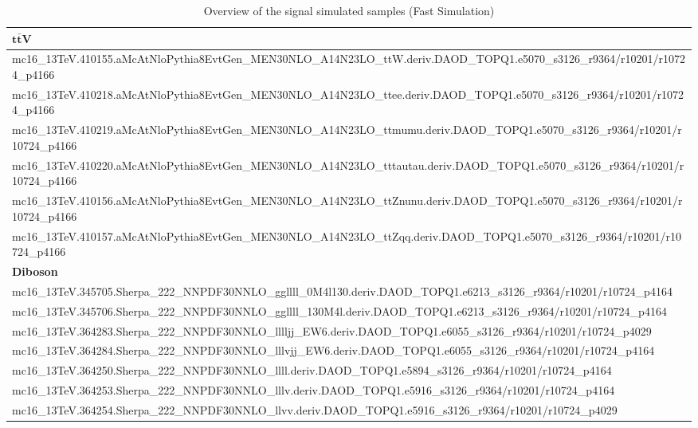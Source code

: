 	
	\begin{table}[htbp]
	\caption {Overview of the signal simulated samples (Fast Simulation)}
	\label{tab:mc_bkg_nom}
		\notsotiny
		\centering
	\begin{adjustwidth}{-0.6cm}{}
			\begin{tabular}{l}
			\toprule	
			$\mathbf{t\bar{t}V}$ \\
			\hline
			mc16\_13TeV.410155.aMcAtNloPythia8EvtGen\_MEN30NLO\_A14N23LO\_ttW.deriv.DAOD\_TOPQ1.e5070\_s3126\_r9364/r10201/r10724\_p4166 \\
			mc16\_13TeV.410218.aMcAtNloPythia8EvtGen\_MEN30NLO\_A14N23LO\_ttee.deriv.DAOD\_TOPQ1.e5070\_s3126\_r9364/r10201/r10724\_p4166 \\
			mc16\_13TeV.410219.aMcAtNloPythia8EvtGen\_MEN30NLO\_A14N23LO\_ttmumu.deriv.DAOD\_TOPQ1.e5070\_s3126\_r9364/r10201/r10724\_p4166 \\
			mc16\_13TeV.410220.aMcAtNloPythia8EvtGen\_MEN30NLO\_A14N23LO\_tttautau.deriv.DAOD\_TOPQ1.e5070\_s3126\_r9364/r10201/r10724\_p4166 \\
			mc16\_13TeV.410156.aMcAtNloPythia8EvtGen\_MEN30NLO\_A14N23LO\_ttZnunu.deriv.DAOD\_TOPQ1.e5070\_s3126\_r9364/r10201/r10724\_p4166 \\
			mc16\_13TeV.410157.aMcAtNloPythia8EvtGen\_MEN30NLO\_A14N23LO\_ttZqq.deriv.DAOD\_TOPQ1.e5070\_s3126\_r9364/r10201/r10724\_p4166 \\
			\hline
			\textbf{Diboson} \\
			\hline
			mc16\_13TeV.345705.Sherpa\_222\_NNPDF30NNLO\_ggllll\_0M4l130.deriv.DAOD\_TOPQ1.e6213\_s3126\_r9364/r10201/r10724\_p4164 \\
			mc16\_13TeV.345706.Sherpa\_222\_NNPDF30NNLO\_ggllll\_130M4l.deriv.DAOD\_TOPQ1.e6213\_s3126\_r9364/r10201/r10724\_p4164 \\
			mc16\_13TeV.364283.Sherpa\_222\_NNPDF30NNLO\_lllljj\_EW6.deriv.DAOD\_TOPQ1.e6055\_s3126\_r9364/r10201/r10724\_p4029 \\
			mc16\_13TeV.364284.Sherpa\_222\_NNPDF30NNLO\_lllvjj\_EW6.deriv.DAOD\_TOPQ1.e6055\_s3126\_r9364/r10201/r10724\_p4164 \\
			mc16\_13TeV.364250.Sherpa\_222\_NNPDF30NNLO\_llll.deriv.DAOD\_TOPQ1.e5894\_s3126\_r9364/r10201/r10724\_p4164 \\
			mc16\_13TeV.364253.Sherpa\_222\_NNPDF30NNLO\_lllv.deriv.DAOD\_TOPQ1.e5916\_s3126\_r9364/r10201/r10724\_p4164 \\
			mc16\_13TeV.364254.Sherpa\_222\_NNPDF30NNLO\_llvv.deriv.DAOD\_TOPQ1.e5916\_s3126\_r9364/r10201/r10724\_p4029 \\

\end{tabular}
\end{adjustwidth}
\end{table}
